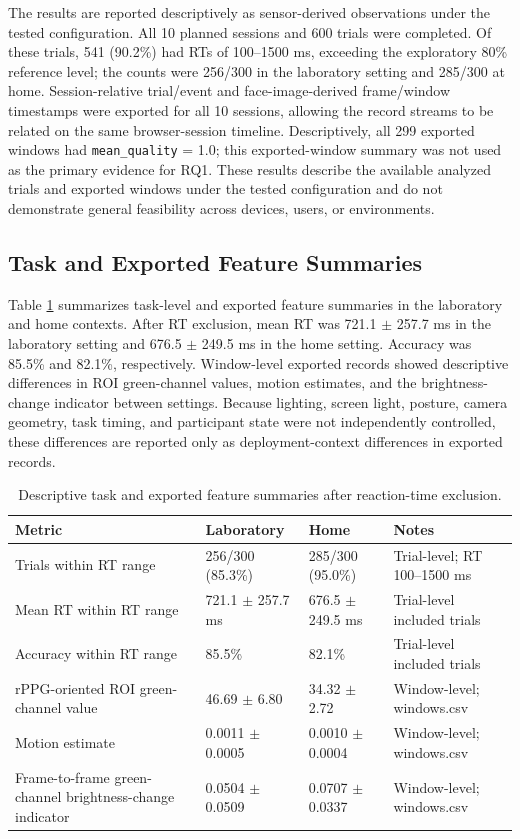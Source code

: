 \documentclass[dvipdfmx]{ehis}
\begin{document}
The results are reported descriptively as sensor-derived observations under the tested configuration.
All 10 planned sessions and 600 trials were completed.
Of these trials, 541 (90.2\%) had RTs of 100--1500 ms, exceeding the exploratory 80\% reference level; the counts were 256/300 in the laboratory setting and 285/300 at home.
Session-relative trial/event and face-image-derived frame/window timestamps were exported for all 10 sessions, allowing the record streams to be related on the same browser-session timeline.
Descriptively, all 299 exported windows had \texttt{mean\_quality} = 1.0; this exported-window summary was not used as the primary evidence for RQ1.
These results describe the available analyzed trials and exported windows under the tested configuration and do not demonstrate general feasibility across devices, users, or environments.

\subsection{Task and Exported Feature Summaries}
Table \ref{tab:data_quality} summarizes task-level and exported feature summaries in the laboratory and home contexts.
After RT exclusion, mean RT was 721.1 $\pm$ 257.7 ms in the laboratory setting and 676.5 $\pm$ 249.5 ms in the home setting.
Accuracy was 85.5\% and 82.1\%, respectively.
Window-level exported records showed descriptive differences in ROI green-channel values, motion estimates, and the brightness-change indicator between settings.
Because lighting, screen light, posture, camera geometry, task timing, and participant state were not independently controlled, these differences are reported only as deployment-context differences in exported records.

\begin{table}[t]
\centering
\caption{Descriptive task and exported feature summaries after reaction-time exclusion.}
\label{tab:data_quality}
\footnotesize
\begin{tabular}{@{}p{}p{}p{}p{}@{}}
\toprule
\textbf{Metric} & \textbf{Laboratory} & \textbf{Home} & \textbf{Notes} \\
\midrule
Trials within RT range & 256/300 (85.3\%) & 285/300 (95.0\%) & Trial-level; RT 100--1500 ms \\
Mean RT within RT range & 721.1 $\pm$ 257.7 ms & 676.5 $\pm$ 249.5 ms & Trial-level included trials \\
Accuracy within RT range & 85.5\% & 82.1\% & Trial-level included trials \\
rPPG-oriented ROI green-channel value & 46.69 $\pm$ 6.80 & 34.32 $\pm$ 2.72 & Window-level; windows.csv \\
Motion estimate & 0.0011 $\pm$ 0.0005 & 0.0010 $\pm$ 0.0004 & Window-level; windows.csv \\
Frame-to-frame green-channel brightness-change indicator & 0.0504 $\pm$ 0.0509 & 0.0707 $\pm$ 0.0337 & Window-level; windows.csv \\
\bottomrule
\end{tabular}
\end{table}
\end{document}
